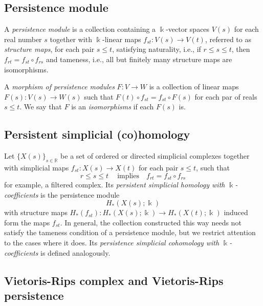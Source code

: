 \documentclass{amsart}
\begin{document}
	\subsection*{Persistence module} \label{persistence_module}
	
	A \textit{persistence module} is a collection containing a $\Bbbk$-vector spaces $V(s)$ for each real number $s$ together with $\Bbbk$-linear maps $f_{st} : V(s) \to V(t)$, referred to as \textit{structure maps}, for each pair $s \leq t$, satisfying	naturality, i.e., if $r \leq s \leq t$, then $f_{rt} = f_{st} \circ f_{rs}$ and tameness, i.e., all but finitely many structure maps are isomorphisms.
	
	A \textit{morphism of persistence modules} $F : V \to W$ is a collection of linear maps $F(s) : V(s) \to W(s)$ such that $F(t) \circ f_{st} = f_{st} \circ F(s)$ for each par of reals $s \leq t$.	We say that $F$ is an \textit{isomorphisms} if each $F(s)$ is.
	
	\subsection*{Persistent simplicial (co)homology} \label{persistent_simplicial_(co)homology}
	
	Let $\{X(s)\}_{s \in \mathbb R} $ be a set of ordered or directed simplicial complexes together with simplicial maps $f_{st} : X(s) \to X(t)$ for each pair $s \leq t$, such that 
	\begin{equation*}
	r \leq s \leq t\ \quad\text{implies} \quad f_{rt} = f_{st} \circ f_{rs}
	\end{equation*}
	for example, a 
	filtered complex. Its \textit{persistent simplicial homology with} $\Bbbk$\textit{-coefficients} is the persistence module
	\begin{equation*}
	H_*(X(s); \Bbbk)
	\end{equation*}
	with structure maps $H_*(f_{st}) : H_*(X(s); \Bbbk) \to H_*(X(t); \Bbbk)$ induced form the maps $f_{st}.$ In general, the collection constructed this way needs not satisfy the tameness condition of a 
	persistence module, but we restrict attention to the cases where it does. Its \textit{persistence simplicial cohomology with} $\Bbbk$\textit{-coefficients} is defined analogously.
	
	\subsection*{Vietoris-Rips complex and Vietoris-Rips persistence} \label{vietoris-rips_complex_and_vietoris-rips_persistence}
	
\end{document}
